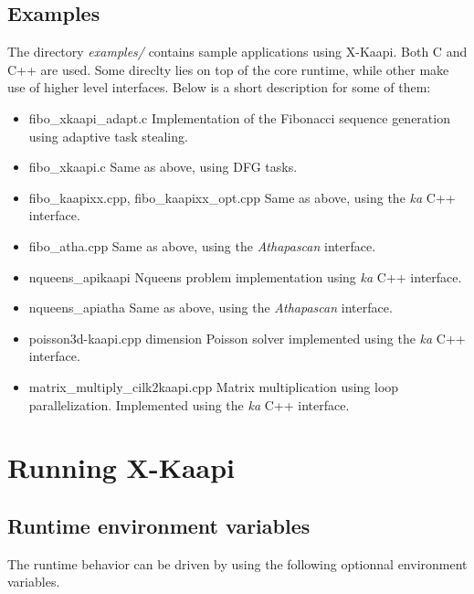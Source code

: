 \documentclass{article}
\newcommand{\kaapi}{\textsc{X}-Kaapi\xspace}
\begin{document}
\subsection{Examples}
The directory \textit{examples/} contains sample applications using \kaapi.
Both C and C++ are used. Some direclty lies on top of the core runtime,
while other make use of higher level interfaces. Below is a short
description for some of them:
\begin{itemize}
\item fibo\_xkaapi\_adapt.c\newline
Implementation of the Fibonacci sequence generation using adaptive
task stealing.
\item fibo\_xkaapi.c\newline
Same as above, using DFG tasks.
\item fibo\_kaapixx.cpp, fibo\_kaapixx\_opt.cpp\newline
Same as above, using the \textit{ka} C++ interface.
\item fibo\_atha.cpp\newline
Same as above, using the \textit{Athapascan} interface.
\item nqueens\_apikaapi\newline
Nqueens problem implementation using \textit{ka} C++ interface.
\item nqueens\_apiatha\newline
Same as above, using the \textit{Athapascan} interface.
\item poisson3d-kaapi.cpp dimension Poisson solver implemented using the \textit{ka}
C++ interface.
\item matrix\_multiply\_cilk2kaapi.cpp\newline
Matrix multiplication using loop parallelization. Implemented using
the \textit{ka} C++ interface.
\end{itemize}

\section{Running \kaapi}
\subsection{Runtime environment variables}
The runtime behavior can be driven by using the following
optionnal environment variables.
\end{document}
